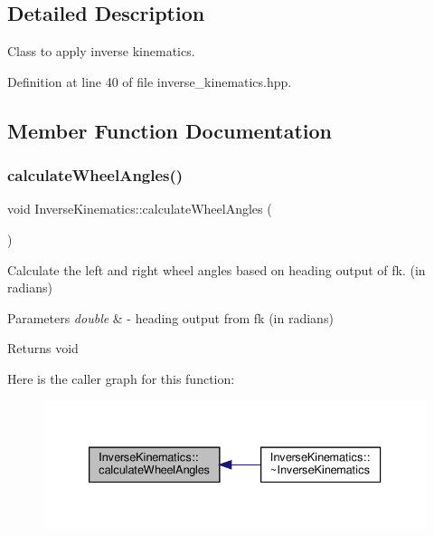 \subsection{Detailed Description}
Class to apply inverse kinematics. 

Definition at line 40 of file inverse\+\_\+kinematics.\+hpp.



\subsection{Member Function Documentation}
\mbox{\label{classInverseKinematics_a5b4820979ff3b4b6e0a3346cd472fefe}} 
\subsubsection{\texorpdfstring{calculate\+Wheel\+Angles()}{calculateWheelAngles()}}
{\footnotesize\ttfamily void Inverse\+Kinematics\+::calculate\+Wheel\+Angles (\begin{DoxyParamCaption}\item[{double}]{ }\end{DoxyParamCaption})}



Calculate the left and right wheel angles based on heading output of fk. (in radians) 


\begin{DoxyParams}{Parameters}
{\em double} & -\/ heading output from fk (in radians) \\
\hline
\end{DoxyParams}
\begin{DoxyReturn}{Returns}
void 
\end{DoxyReturn}
Here is the caller graph for this function\+:
\nopagebreak
\begin{figure}[H]
\begin{center}
\leavevmode
\includegraphics[width=333pt]{classInverseKinematics_a5b4820979ff3b4b6e0a3346cd472fefe_icgraph}
\end{center}
\end{figure}
\mbox{\label{classInverseKinematics_a7e72ae559e17363495da967d98fb7985}} 
